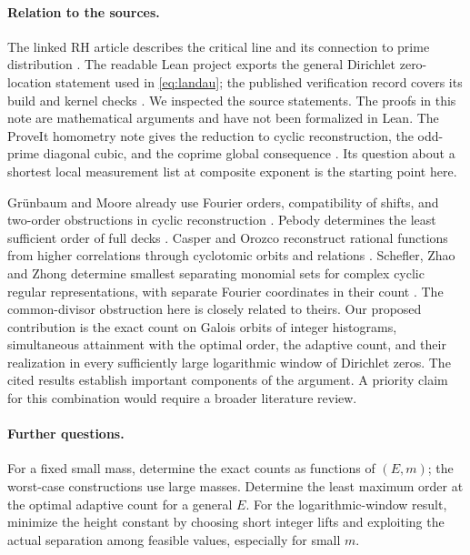 \documentclass[11pt,letterpaper]{article}
\begin{document}
\paragraph{Relation to the sources.}
The linked RH article describes the critical line and its connection to prime distribution \cite{Wiki}. The readable Lean project exports the general Dirichlet zero-location statement used in \eqref{eq:landau}; the published verification record covers its build and kernel checks \cite{Lean,Check}. We inspected the source statements. The proofs in this note are mathematical arguments and have not been formalized in Lean. The ProveIt homometry note gives the reduction to cyclic reconstruction, the odd-prime diagonal cubic, and the coprime global consequence \cite{Packet}. Its question about a shortest local measurement list at composite exponent is the starting point here.

Gr\"unbaum and Moore already use Fourier orders, compatibility of shifts, and two-order obstructions in cyclic reconstruction \cite{GM}. Pebody determines the least sufficient order of full decks \cite{Pebody}. Casper and Orozco reconstruct rational functions from higher correlations through cyclotomic orbits and relations \cite{CO}. Schefler, Zhao and Zhong determine smallest separating monomial sets for complex cyclic regular representations, with separate Fourier coordinates in their count \cite[Prop.~4.8]{SZZ}. The common-divisor obstruction here is closely related to theirs. Our proposed contribution is the exact count on Galois orbits of integer histograms, simultaneous attainment with the optimal order, the adaptive count, and their realization in every sufficiently large logarithmic window of Dirichlet zeros. The cited results establish important components of the argument. A priority claim for this combination would require a broader literature review.

\paragraph{Further questions.}
For a fixed small mass, determine the exact counts as functions of $(E,m)$; the worst-case constructions use large masses. Determine the least maximum order at the optimal adaptive count for a general $E$. For the logarithmic-window result, minimize the height constant by choosing short integer lifts and exploiting the actual separation among feasible values, especially for small $m$.
\newpage
\end{document}
